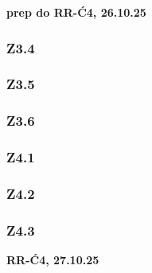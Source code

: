 \documentclass[10pt,a4paper]{article}
\newcommand{\zagadnienie}[3]{%
    \clearpage %
    \noindent\textbf{#1} #2\\
    #3
}
\begin{document}
\zagadnienie{prep do RR-Ć4, 26.10.25}{}
{
    \subsubsection*{Z3.4}
    \begin{quote}
    \end{quote}

    \subsubsection*{Z3.5}
    \begin{quote}
    \end{quote}

    \subsubsection*{Z3.6}
    \begin{quote}
    \end{quote}
        
    \subsubsection*{Z4.1}
    \begin{quote}
    \end{quote}

    \subsubsection*{Z4.2}
    \begin{quote}
    \end{quote}

    \subsubsection*{Z4.3}
    \begin{quote}
    \end{quote}
}
\zagadnienie{RR-Ć4, 27.10.25}{}
{
}
\end{document}
